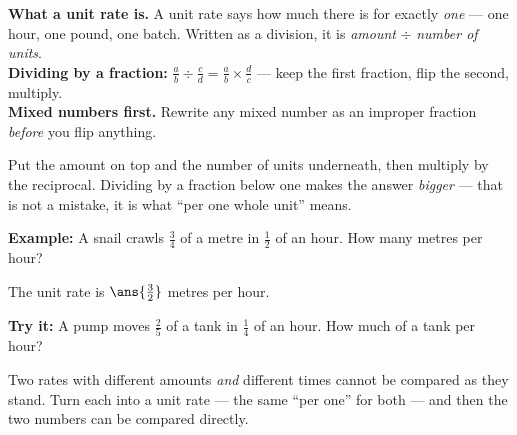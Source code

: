 \documentclass[12pt]{article}
\begin{document}

\begin{formulabox}
\textbf{What a unit rate is.} A unit rate says how much there is for exactly
\emph{one} --- one hour, one pound, one batch. Written as a division, it is
\emph{amount} $\div$ \emph{number of units}.\\[3pt]
\textbf{Dividing by a fraction:} $\frac{a}{b} \div \frac{c}{d} = \frac{a}{b}
\times \frac{d}{c}$ --- keep the first fraction, flip the second, multiply.\\[3pt]
\textbf{Mixed numbers first.} Rewrite any mixed number as an improper fraction
\emph{before} you flip anything.
\end{formulabox}


\begin{formulabox}
Put the amount on top and the number of units underneath, then multiply by the
reciprocal. Dividing by a fraction below one makes the answer \emph{bigger} ---
that is not a mistake, it is what ``per one whole unit'' means.
\end{formulabox}

\begin{examplebox}
\textbf{Example:} A snail crawls $\frac{3}{4}$ of a metre in $\frac{1}{2}$ of
an hour. How many metres per hour?

The unit rate is $\ans{\tfrac{3}{2}}$ metres per hour.
\end{examplebox}

\begin{tryitbox}
\textbf{Try it:} A pump moves $\frac{2}{5}$ of a tank in $\frac{1}{4}$ of an
hour. How much of a tank per hour?\\[2pt]
\end{tryitbox}


\begin{formulabox}
Two rates with different amounts \emph{and} different times cannot be compared
as they stand. Turn each into a unit rate --- the same ``per one'' for both ---
and then the two numbers can be compared directly.
\end{formulabox}
\end{document}
